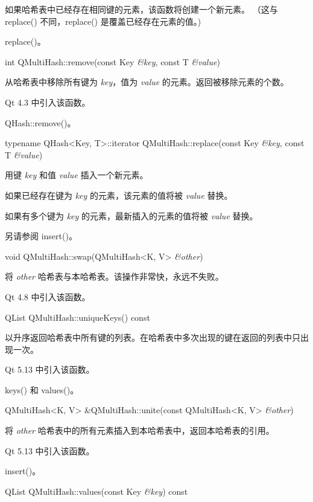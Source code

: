 如果哈希表中已经存在相同键的元素，该函数将创建一个新元素。
（这与 replace() 不同，replace() 是覆盖已经存在元素的值。)

\begin{seeAlso}
replace()。
\end{seeAlso}

int QMultiHash::remove(const Key \emph{\&key}, const T \emph{\&value})

从哈希表中移除所有键为 \emph{key}，值为 \emph{value} 的元素。返回被移除元素的个数。

Qt 4.3 中引入该函数。

\begin{seeAlso}
QHash::remove()。
\end{seeAlso}

typename QHash<Key, T>::iterator QMultiHash::replace(const Key \emph{\&key}, const T \emph{\&value})

用键 \emph{key} 和值 \emph{value} 插入一个新元素。

如果已经存在键为 \emph{key} 的元素，该元素的值将被 \emph{value} 替换。

如果有多个键为 \emph{key} 的元素，最新插入的元素的值将被 \emph{value} 替换。

\begin{seeAlso}
另请参阅 insert()。
\end{seeAlso}

void QMultiHash::swap(QMultiHash<K, V> \emph{\&other})

将 \emph{other} 哈希表与本哈希表。该操作非常快，永远不失败。

Qt 4.8 中引入该函数。

QList QMultiHash::uniqueKeys() const

以升序返回哈希表中所有键的列表。在哈希表中多次出现的键在返回的列表中只出现一次。

Qt 5.13 中引入该函数。

\begin{seeAlso}
keys() 和 values()。
\end{seeAlso}

QMultiHash<K, V> \&QMultiHash::unite(const QMultiHash<K, V> \emph{\&other})

将 \emph{other} 哈希表中的所有元素插入到本哈希表中，返回本哈希表的引用。

Qt 5.13 中引入该函数。

\begin{seeAlso}
insert()。
\end{seeAlso}

QList QMultiHash::values(const Key \emph{\&key}) const

